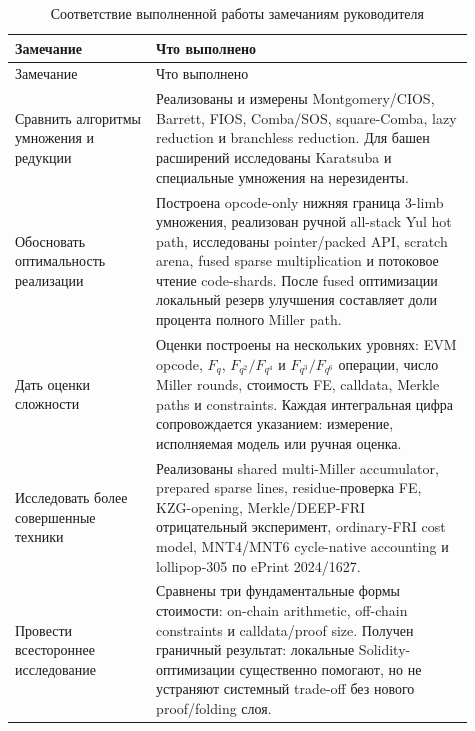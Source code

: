 \documentclass[12pt,a4paper]{article}
\begin{document}
\begin{longtable}{p{0.28\linewidth}p{0.63\linewidth}}
\caption{Соответствие выполненной работы замечаниям руководителя}\\
\toprule
Замечание & Что выполнено \\
\midrule
\endfirsthead
\toprule
Замечание & Что выполнено \\
\midrule
\endhead
Сравнить алгоритмы умножения и редукции &
Реализованы и измерены Montgomery/CIOS, Barrett, FIOS, Comba/SOS,
square-Comba, lazy reduction и branchless reduction. Для башен расширений
исследованы Karatsuba и специальные умножения на нерезиденты. \\
\addlinespace
Обосновать оптимальность реализации &
Построена opcode-only нижняя граница 3-limb умножения, реализован ручной
all-stack Yul hot path, исследованы pointer/packed API, scratch arena,
fused sparse multiplication и потоковое чтение code-shards. После fused
оптимизации локальный резерв улучшения составляет доли процента полного
Miller path. \\
\addlinespace
Дать оценки сложности &
Оценки построены на нескольких уровнях: EVM opcode, $F_q$,
$F_{q^2}/F_{q^4}$ и $F_{q^3}/F_{q^6}$ операции, число Miller rounds,
стоимость FE, calldata, Merkle paths и constraints. Каждая интегральная
цифра сопровождается указанием: измерение, исполняемая модель или ручная
оценка. \\
\addlinespace
Исследовать более совершенные техники &
Реализованы shared multi-Miller accumulator, prepared sparse lines,
residue-проверка FE, KZG-opening, Merkle/DEEP-FRI отрицательный эксперимент,
ordinary-FRI cost model, MNT4/MNT6 cycle-native accounting и
lollipop-305 по ePrint 2024/1627. \\
\addlinespace
Провести всестороннее исследование &
Сравнены три фундаментальные формы стоимости: on-chain arithmetic,
off-chain constraints и calldata/proof size. Получен граничный результат:
локальные Solidity-оптимизации существенно помогают, но не устраняют
системный trade-off без нового proof/folding слоя. \\
\bottomrule
\end{longtable}
\end{document}
